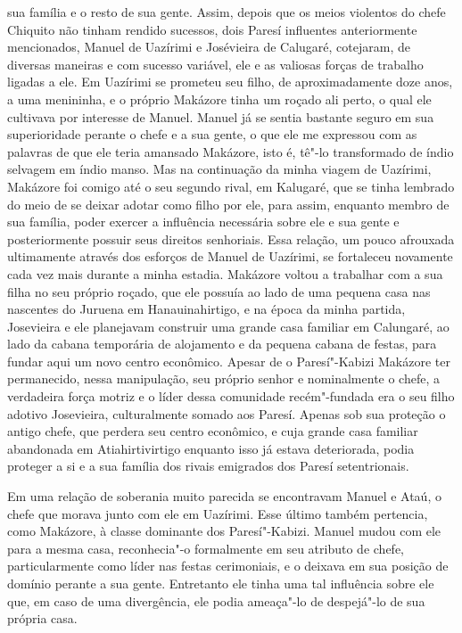 sua família e o resto de sua gente. Assim, depois que os meios violentos
do chefe Chiquito não tinham rendido sucessos, dois Paresí influentes
anteriormente mencionados, Manuel de Uazírimi e Josévieira de
Calugaré, cotejaram, de diversas maneiras e com sucesso variável, ele e
as valiosas forças de trabalho ligadas a ele. Em Uazírimi se prometeu
seu filho, de aproximadamente doze anos, a uma menininha, e o próprio
Makázore tinha um roçado ali perto, o qual ele cultivava por interesse
de Manuel. Manuel já se sentia bastante seguro em sua superioridade
perante o chefe e a sua gente, o que ele me expressou com as palavras de
que ele teria amansado Makázore, isto é, tê"-lo transformado de índio
selvagem em índio manso. Mas na continuação da minha viagem de
Uazírimi, Makázore foi comigo até o seu segundo rival, em Kalugaré, que
se tinha lembrado do meio de se deixar adotar como filho por ele, para
assim, enquanto membro de sua família, poder exercer a influência
necessária sobre ele e sua gente e posteriormente possuir seus direitos
senhoriais. Essa relação, um pouco afrouxada ultimamente através dos
esforços de Manuel de Uazírimi, se fortaleceu novamente cada vez mais
durante a minha estadia. Makázore voltou a trabalhar com a sua filha no
seu próprio roçado, que ele possuía ao lado de uma pequena casa nas
nascentes do Juruena em Hanauinahirtigo, e na época da minha partida,
Josevieira e ele planejavam construir uma grande casa familiar em
Calungaré, ao lado da cabana temporária de alojamento e da pequena
cabana de festas, para fundar aqui um novo centro econômico. Apesar de o
Paresí"-Kabizi Makázore ter permanecido, nessa manipulação, seu próprio
senhor e nominalmente o chefe, a verdadeira força motriz e o líder dessa
comunidade recém"-fundada era o seu filho adotivo Josevieira,
culturalmente somado aos Paresí. Apenas sob sua proteção o antigo chefe,
que perdera seu centro econômico, e cuja grande casa familiar abandonada
em Atiahirtivirtigo enquanto isso já estava deteriorada, podia proteger
a si e a sua família dos rivais emigrados dos Paresí setentrionais.

Em uma relação de soberania muito parecida se encontravam Manuel e
Ataú, o chefe que morava junto com ele em Uazírimi. Esse último também
pertencia, como Makázore, à classe dominante dos Paresí"-Kabizi. Manuel
mudou com ele para a mesma casa, reconhecia"-o formalmente em seu
atributo de chefe, particularmente como líder nas festas cerimoniais, e
o deixava em sua posição de domínio perante a sua gente. Entretanto ele
tinha uma tal influência sobre ele que, em caso de uma divergência, ele
podia ameaça"-lo de despejá"-lo de sua própria casa.

